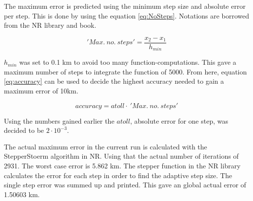 The maximum error is predicted using the minimum step size and absolute error per step.
This is done by using the equation \ref{eq:NoSteps}.
Notations are borrowed from the NR library and book.

\begin{equation}
'Max.\ no.\ steps' = \frac{x_2 - x_1}{h_{min}}
\label{eq:NoSteps}
\end{equation}

\(h_{min}\) was set to 0.1 km to avoid too many function-computations.
This gave a maximum number of steps to integrate the function of 5000.
From here, equation \ref{eq:accuracy} can be used to decide the highest accuracy needed to gain a maximum error of 10km.

\begin{equation}
accuracy = atoll \cdot \ 'Max.\ no.\ steps'
\label{eq:accuracy}
\end{equation}

Using the numbers gained earlier the \(atoll\), absolute error for one step, was decided to be \(2\cdot10^{-3}\).

The actual maximum error in the current run is calculated with the StepperStoerm algorithm in NR.
Using that the actual number of iterations of 2931.
The worst case error is 5.862 km.
The stepper function in the NR library calculates the error for each step in order to find the adaptive step size. 
The single step error was summed up and printed.
This gave an global actual error of 1.50603 km. 

